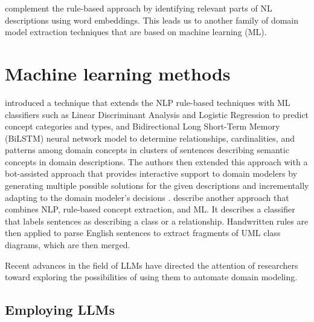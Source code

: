 \citet{Burgueno2021} complement the rule-based approach by identifying relevant parts of NL descriptions using word embeddings.
This leads us to another family of domain model extraction techniques that are based on machine learning (ML).


\section{Machine learning methods}

\citet{Saini2020,Saini2020a,Saini2020b} introduced a technique that extends the NLP rule-based techniques with ML classifiers such as Linear Discriminant Analysis and Logistic Regression to predict concept categories and types, and Bidirectional Long Short-Term Memory (BiLSTM) neural network model to determine relationships, cardinalities, and patterns among domain concepts in clusters of sentences describing semantic concepts in domain descriptions.
The authors then extended this approach with a bot-assisted approach that provides interactive support to domain modelers by generating multiple possible solutions for the given descriptions and incrementally adapting to the domain modeler's decisions \cite{Saini2022}.
\citet{Yang2022} describe another approach that combines NLP, rule-based concept extraction, and ML. It describes a classifier that labels sentences as describing a class or a relationship. Handwritten rules are then applied to parse English sentences to extract fragments of UML class diagrams, which are then merged.

Recent advances in the field of LLMs have directed the attention of researchers toward exploring the possibilities of using them to automate domain modeling.


\subsection{Employing LLMs}

